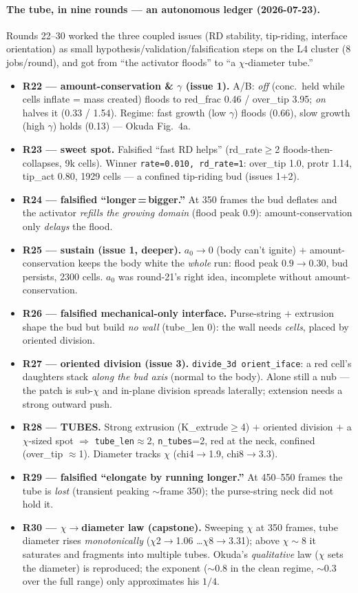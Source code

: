 \documentclass[11pt]{article}
\begin{document}
\paragraph{The tube, in nine rounds --- an autonomous ledger (2026-07-23).}
Rounds 22--30 worked the three coupled issues (RD stability, tip-riding, interface orientation) as
small hypothesis/validation/falsification steps on the L4 cluster (8 jobs/round), and got from ``the
activator floods'' to ``a $\chi$-diameter tube.''
\begin{itemize}\itemsep1pt
\item \textbf{R22 --- amount-conservation \& $\gamma$ (issue 1).} A/B: \emph{off} (conc.\ held while cells
inflate = mass created) floods to red\_frac 0.46 / over\_tip 3.95; \emph{on} halves it (0.33 / 1.54).
Regime: fast growth (low $\gamma$) floods (0.66), slow growth (high $\gamma$) holds (0.13) --- Okuda Fig.~4a.
\item \textbf{R23 --- sweet spot.} Falsified ``fast RD helps'' (rd\_rate$\ge$2 floods-then-collapses, 9k cells).
Winner \texttt{rate=0.010, rd\_rate=1}: over\_tip 1.0, protr 1.14, tip\_act 0.80, 1929 cells --- a confined
tip-riding bud (issues 1+2).
\item \textbf{R24 --- falsified ``longer\,=\,bigger.''} At 350 frames the bud deflates and the activator
\emph{refills the growing domain} (flood peak 0.9): amount-conservation only \emph{delays} the flood.
\item \textbf{R25 --- sustain (issue 1, deeper).} $a_0\!\to\!0$ (body can't ignite) $+$ amount-conservation
keeps the body white the \emph{whole} run: flood peak $0.9\!\to\!0.30$, bud persists, 2300 cells. $a_0$
was round-21's right idea, incomplete without amount-conservation.
\item \textbf{R26 --- falsified mechanical-only interface.} Purse-string $+$ extrusion shape the bud but
build \emph{no wall} (tube\_len 0): the wall needs \emph{cells}, placed by oriented division.
\item \textbf{R27 --- oriented division (issue 3).} \texttt{divide\_3d orient\_iface}: a red cell's daughters
stack \emph{along the bud axis} (normal to the body). Alone still a nub --- the patch is sub-$\chi$ and
in-plane division spreads laterally; extension needs a strong outward push.
\item \textbf{R28 --- TUBES.} Strong extrusion (K\_extrude$\ge$4) $+$ oriented division $+$ a $\chi$-sized
spot $\Rightarrow$ \texttt{tube\_len}$\approx$2, \texttt{n\_tubes}=2, red at the neck, confined (over\_tip
$\approx$1). Diameter tracks $\chi$ (chi4$\to$1.9, chi8$\to$3.3).
\item \textbf{R29 --- falsified ``elongate by running longer.''} At 450--550 frames the tube is \emph{lost}
(transient peaking $\sim$frame 350); the purse-string neck did not hold it.
\item \textbf{R30 --- $\chi\to$diameter law (capstone).} Sweeping $\chi$ at 350 frames, tube diameter rises
\emph{monotonically} ($\chi$2$\to$1.06 \dots $\chi$8$\to$3.31); above $\chi\!\sim\!8$ it saturates and
fragments into multiple tubes. Okuda's \emph{qualitative} law ($\chi$ sets the diameter) is reproduced;
the exponent ($\sim$0.8 in the clean regime, $\sim$0.3 over the full range) only approximates his $1/4$.
\end{itemize}
\end{document}
